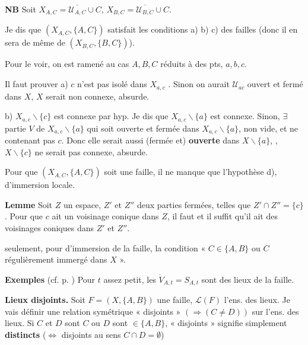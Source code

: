 \documentclass[11pt,a4paper]{article}
\begin{document}
\textbf{NB} Soit $X_{A,C} = \overline{\mathcal{U}_{A,C}} \cup C$, $X_{B,C} = \overline{\mathcal{U}_{B,C}} \cup C$.

Je dis que $(X_{A,C}, \{A,C\})$ satisfait les conditions a) b) c) des failles (donc il en sera de même de $(X_{B,C}, \{B,C\})$).

Pour le voir, on est ramené au cas $A, B, C$ réduits à des pts, $a, b, c$.

Il faut prouver a) \struck{\ill{}} $c$ n'est pas isolé dans $X_{a,c}$ .  Sinon on aurait $\mathcal{U}_{ac}$ ouvert et fermé dans $X$, $X$ serait non connexe, absurde.

b) $X_{a,c} \smallsetminus \{c\}$ est connexe par hyp. Je dis que $X_{a,c} \smallsetminus \{a\}$ est connexe. Sinon,  $\exists$ partie $V$ de $X_{a,c} \smallsetminus \{a\}$ qui soit ouverte et fermée dans $X_{a,c} \smallsetminus \{a\}$, non vide, et ne contenant pas $c$. Donc elle serait aussi  (fermée et) \textbf{ouverte} dans $X \smallsetminus \{a\}$, \struck{\ill{}} \ill{}, $X \smallsetminus \{c\}$ ne serait pas connexe, absurde.

Pour que $(X_{A,C}, \{A,C\})$ soit une faille, il ne manque que l'hypothèse d), d'immersion locale.

\textbf{Lemme} Soit $Z$ un espace, $Z'$ et $Z''$ deux parties fermées, telles que $Z' \cap Z'' = \{c\}$. Pour que $c$ ait un voisinage conique dans $Z$, il faut et il suffit qu'il ait des voisinages coniques dans $Z'$ et $Z''$.

\ill{} seulement, pour \ill{} d'immersion de la faille, la condition \struck{\ill{}} « $C \in \{A,B\}$ ou $C$ régulièrement immergé dans $X$ ».

\textbf{Exemples} (cf. p. \ill{}) Pour $t$ assez petit, les $\dot V_{A,t} = S_{A,t}$ sont des lieux de la faille.

\textbf{Lieux disjoints.} Soit $F = (X, \{A,B\})$ une faille, $\mathcal{L}(F)$ l'ens. des lieux. Je vais définir une relation symétrique \struck{\ill{}} « disjoints » $(\Rightarrow (C \neq D))$ sur l'ens. des lieux. Si $C$ et $D$ sont \ill{} \struck{\ill{}} $C$ ou $D$ sont $\in \{A,B\}$, « disjoints » signifie simplement \textbf{distincts} ($\Longleftrightarrow$ disjoints au sens $C \cap D = \emptyset$)
\end{document}
